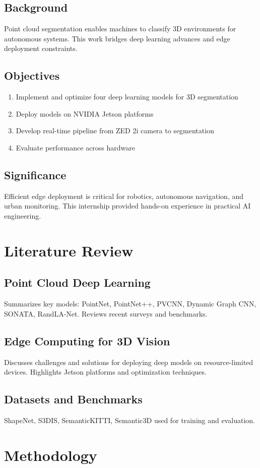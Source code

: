 \documentclass[12pt,a4paper]{report}
\begin{document}
\section{Background}
Point cloud segmentation enables machines to classify 3D environments for autonomous systems. This work bridges deep learning advances and edge deployment constraints.
\section{Objectives}
\begin{enumerate}
    \item Implement and optimize four deep learning models for 3D segmentation
    \item Deploy models on NVIDIA Jetson platforms
    \item Develop real-time pipeline from ZED 2i camera to segmentation
    \item Evaluate performance across hardware
\end{enumerate}
\section{Significance}
Efficient edge deployment is critical for robotics, autonomous navigation, and urban monitoring. This internship provided hands-on experience in practical AI engineering.
\chapter{Literature Review}
\section{Point Cloud Deep Learning}
Summarizes key models: PointNet, PointNet++, PVCNN, Dynamic Graph CNN, SONATA, RandLA-Net. Reviews recent surveys and benchmarks.
\section{Edge Computing for 3D Vision}
Discusses challenges and solutions for deploying deep models on resource-limited devices. Highlights Jetson platforms and optimization techniques.
\section{Datasets and Benchmarks}
ShapeNet, S3DIS, SemanticKITTI, Semantic3D used for training and evaluation.
\chapter{Methodology}
\end{document}
